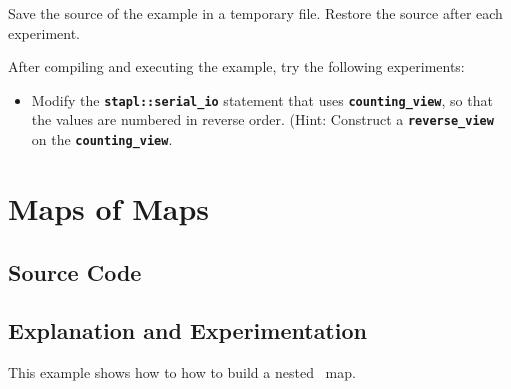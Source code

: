 \documentclass{report}
\begin{document}
Save the source of the example in a temporary file.
Restore the source after each experiment.

After compiling and executing the example, try the following experiments:
\begin{itemize}
\item
Modify the
\texttt{{\bf stapl::serial\_io}}
statement that uses
\texttt{{\bf counting\_view}},
so that the values are numbered in reverse order.
(Hint: Construct a
\texttt{{\bf reverse\_view}}
on the
\texttt{{\bf counting\_view}}.

\end{itemize}


\pagebreak
\section{Maps of Maps}

\subsection{Source Code}



\subsection{Explanation and Experimentation}

This example shows how to how to build a nested \stapl\ map.
\end{document}
